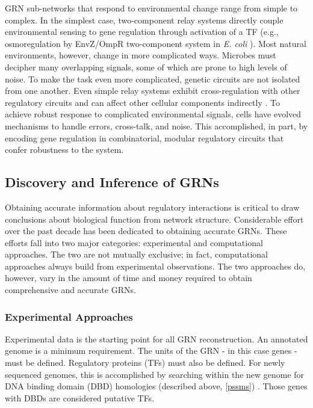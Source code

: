 GRN sub-networks that respond to environmental change range from simple to complex. In the simplest case, two-component relay systems directly couple environmental sensing to gene regulation through activation of a TF (e.g., osmoregulation by EnvZ/OmpR two-component system in \textit{E. coli} \cite{aiba_evidence_1989}). Most natural environments, however, change in more complicated ways. Microbes must decipher  many overlapping signals, some of which are prone to high levels of noise. To make the task even more complicated, genetic circuits are not isolated from one another. Even simple relay systems exhibit cross-regulation with other regulatory circuits and can affect other cellular components indirectly \cite{laub_specificity_2007}. To achieve robust response to complicated environmental signals, cells have evolved mechanisms to handle errors, cross-talk, and noise. This accomplished, in part, by encoding gene regulation in combinatorial, modular regulatory circuits that confer robustness to the system.   

\subsection{Discovery and Inference of GRNs}

Obtaining accurate information about regulatory interactions is critical to draw conclusions about biological function from network structure. Considerable effort over the past decade has been dedicated to obtaining accurate GRNs. These efforts fall into two major categories: experimental and computational approaches. The two are not mutually exclusive; in fact, computational approaches always build from experimental observations. The two approaches do, however, vary in the amount of time and money required to obtain comprehensive and accurate GRNs. 

\subsubsection{Experimental Approaches}

Experimental data is the starting point for all GRN reconstruction. An annotated genome is a minimum requirement. The units of the GRN - in this case genes - must be defined. Regulatory proteins (TFs) must also be defined. For newly sequenced genomes, this is accomplished by searching within the new genome for DNA binding domain (DBD) homologies (described above, \ref{pssms}) \cite{bonneau_comprehensive_2004}. Those genes with DBDs are considered putative TFs. 

